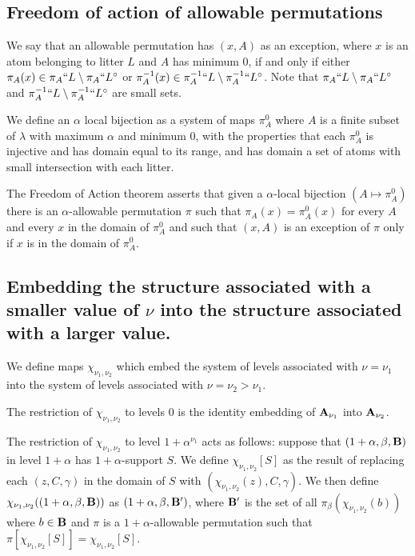 \documentclass[12pt]{article}
\begin{document}
\subsection{Freedom of action of allowable permutations}

We say that an allowable permutation has $(x,A)$ as an exception, where $x$ is an atom belonging to litter $L$ and  $A$ has minimum 0, if and only if  either $\pi_A(x) \in \pi_A``L \setminus \pi_A``L^\circ$ or $\pi^{-1}_A(x) \in \pi_A^{-1}``L \setminus \pi^{-1}_A``L^\circ$.  Note that $\pi_A``L \setminus \pi_A``L^\circ$ and $\pi_A^{-1}``L \setminus \pi^{-1}_A``L^\circ$ are small sets.


We define an $\alpha$ local bijection as a system of maps $\pi^0_A$ where $A$ is a finite subset of $\lambda$ with maximum $\alpha$ and minimum 0, with the properties that each $\pi^0_A$ is injective and has domain equal to its range, and has domain a set of atoms with small intersection with each litter.

The Freedom of Action theorem asserts that given a $\alpha$-local bijection $(A \mapsto \pi^0_A)$  there is an $\alpha$-allowable permutation $\pi$ such that $\pi_A(x) = \pi^0_A(x)$ for every $A$ and every $x$ in the domain of $\pi^0_A$  and such that $(x,A)$ is an exception of $\pi$ only if $x$ is in the domain of $\pi^0_A$.

\subsection{Embedding the structure associated with a smaller value of $\nu$ into the structure associated with a larger value.}

We define maps $\chi_{\nu_1,\nu_2}$ which embed the system of levels associated with $\nu=\nu_1$
into the system of levels associated with $\nu=\nu_2>\nu_1$.

The restriction of $\chi_{\nu_1,\nu_2}$ to levels 0 is the identity embedding of ${\bf A}_{\nu_1}$ into ${\bf A}_{\nu_2}$.

The restriction of $\chi_{\nu_1,\nu_2}$ to level $1+\alpha^{\nu_1}$ acts as follows:  suppose that \newline$(1+\alpha,\beta,{\bf B})$ in level $1+\alpha$ has $1+\alpha$-support $S$.  We define $\chi_{\nu_1,\nu_2}[S]$ as the result of replacing each $(z,C,\gamma)$ in the domain of $S$ with $(\chi_{\nu_1,\nu_2}(z),C,\gamma)$.  We then define $\chi_{\nu_1,\nu_2}((1+\alpha,\beta,{\bf B}))$ as $(1+\alpha,\beta,{\bf B}')$, where ${\bf B}'$ is the set of all $\pi_\beta(\chi_{\nu_1,\nu_2}(b))$ where $b \in {\bf B}$ and $\pi$ is a $1+\alpha$-allowable permutation such that $\pi[\chi_{\nu_1,\nu_2}[S]] = \chi_{\nu_1,\nu_2}[S]$.
\end{document}
